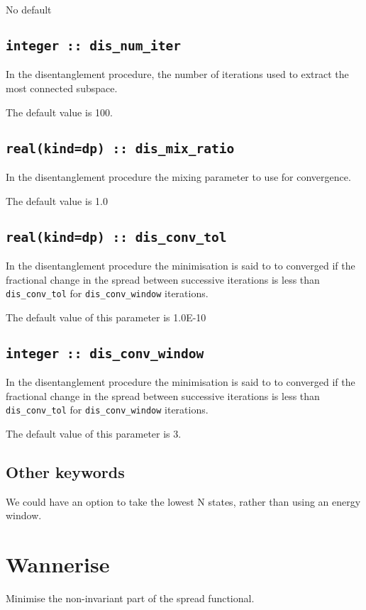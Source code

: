 No default

\subsection[dis\_num\_iter]{\tt integer :: dis\_num\_iter}
In the disentanglement procedure, the
number of iterations used to extract the most connected subspace.

The default value is 100.

\subsection[dis\_mix\_ratio]{\tt real(kind=dp) :: dis\_mix\_ratio}
In the disentanglement procedure the mixing parameter to use for
convergence.

The default value is 1.0

\subsection[dis\_conv\_tol]{\tt real(kind=dp) :: dis\_conv\_tol}

In the disentanglement procedure the minimisation is said to to converged
if the fractional change in the spread between successive
iterations is less than
\verb#dis_conv_tol# for \verb#dis_conv_window# iterations.

The default value of this parameter is 1.0E-10


\subsection[dis\_conv\_window]{\tt integer :: dis\_conv\_window}

In the disentanglement procedure the minimisation is said to to converged
if the fractional change in the spread between successive
iterations is less than
\verb#dis_conv_tol# for \verb#dis_conv_window# iterations.

The default value of this parameter is 3.


\subsection{Other keywords}
 We could have an option to take the lowest N states, rather than using
 an energy window.



\section{Wannerise}
Minimise the non-invariant part of the spread functional.


